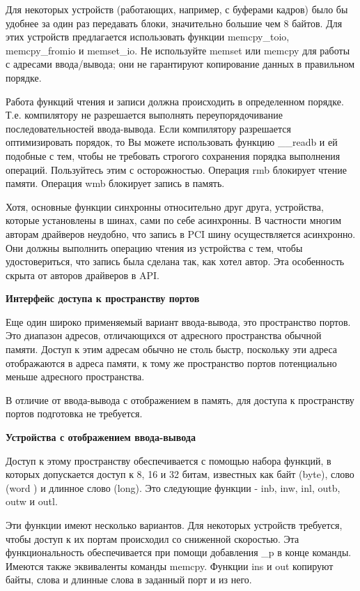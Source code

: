 Для некоторых устройств (работающих, например, с буферами кадров) было бы удобнее за один раз передавать блоки, значительно большие чем 8 байтов. Для этих устройств предлагается использовать функции memcpy\_toio, memcpy\_fromio и memset\_io. Не используйте memset или memcpy для работы с адресами ввода/вывода; они не гарантируют копирование данных в правильном порядке.

Работа функций чтения и записи должна происходить в определенном порядке. Т.е. компилятору не разрешается выполнять переупорядочивание последовательностей ввода-вывода. Если компилятору разрешается оптимизировать порядок, то Вы можете использовать функцию \_\_readb и ей подобные с тем, чтобы не требовать строгого сохранения порядка выполнения операций. Пользуйтесь этим с осторожностью. Операция rmb блокирует чтение памяти. Операция wmb блокирует запись в память.

Хотя, основные функции синхронны относительно друг друга, устройства, которые установлены в шинах, сами по себе асинхронны. В частности многим авторам драйверов неудобно, что запись в PCI шину осуществляется асинхронно. Они должны выполнить операцию чтения из устройства с тем, чтобы удостовериться, что запись была сделана так, как хотел автор. Эта особенность скрыта от авторов драйверов в API.

\textbf{Интерфейс доступа к пространству портов}

Еще один широко применяемый вариант ввода-вывода, это пространство портов\cite{Rosen}. Это диапазон адресов, отличающихся от адресного пространства обычной памяти. Доступ к этим адресам обычно не столь быстр, поскольку эти адреса отображаются в адреса памяти, к тому же пространство портов потенциально меньше адресного пространства.

В отличие от ввода-вывода с отображением в память, для доступа к пространству портов подготовка не требуется.

\textbf{Устройства с отображением ввода-вывода}

Доступ к этому пространству обеспечивается с помощью набора функций, в которых допускается доступ к 8, 16 и 32 битам, известных как байт (byte), слово (word ) и длинное слово (long). Это следующие функции - inb, inw, inl, outb, outw и outl.

Эти функции имеют несколько вариантов. Для некоторых устройств требуется, чтобы доступ к их портам происходил со сниженной скоростью. Эта функциональность обеспечивается при помощи добавления \_p в конце команды. Имеются также эквиваленты команды memcpy. Функции ins и out копируют байты, слова и длинные слова в заданный порт и из него. 

